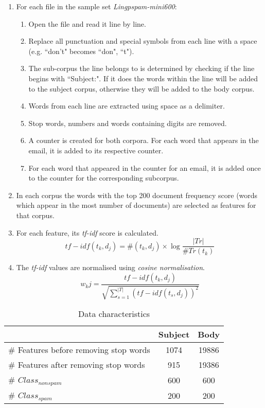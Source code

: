 \documentclass[10pt, a4paper]{article}
\begin{document}
\begin{enumerate}
\item For each file in the sample set \emph{Lingpspam-mini600}:
	\begin{enumerate}[label*=\arabic*.]
	\item Open the file and read it line by line.
	\item Replace all punctuation and special symbols from each line with a space (e.g. ``don't" becomes ``don", ``t").
	\item The sub-corpus the line belongs to is determined by checking if the line begins with ``Subject:". If it does the words within the line will be added to the subject corpus, otherwise they will be added to the body corpus.
	\item Words from each line are extracted using space as a delimiter.
	\item Stop words, numbers and words containing digits are removed.
	\item A counter is created for both corpora. For each word that appears in the email, it is added to its respective counter.
	\item For each word that appeared in the counter for an email, it is added once to the counter for the corresponding subcorpus.
	\end{enumerate}
\item In each corpus the words with the top 200 document frequency score (words which appear in the most number of documents) are selected as features for that corpus.
\item For each feature, its \emph{tf-idf} score is calculated.
$$ tf-idf(t_k, d_j) = \#(t_k, d_j) \times \log \frac{|Tr|}{\#Tr(t_k)} $$
\item The \emph{tf-idf} values are normalised using \emph{cosine normalisation}.
$$ w_kj = \frac{tf-idf(t_k, d_j)}{\sqrt{\sum_{s=1}^{|T|} (tf-idf(t_s, d_j))^2 }} $$
\end{enumerate}

\setlength\extrarowheight{3pt}
\begin{table}[H]
\centering
\caption{Data characteristics}\vspace{1em}
\begin{tabular}{|l||c|c|}
\hline
& \textbf{Subject} & \textbf{Body} \\
\hline\hline
\# Features before removing stop words & 1074 & 19886 \\
\# Features after removing stop words & 915 & 19386 \\
\# $Class_{nonspam}$ & 600 & 600 \\
\# $Class_{spam}$ & 200 & 200 \\
\hline
\end{tabular}
\label{table:datacharacteristics}
\end{table}
\end{document}
